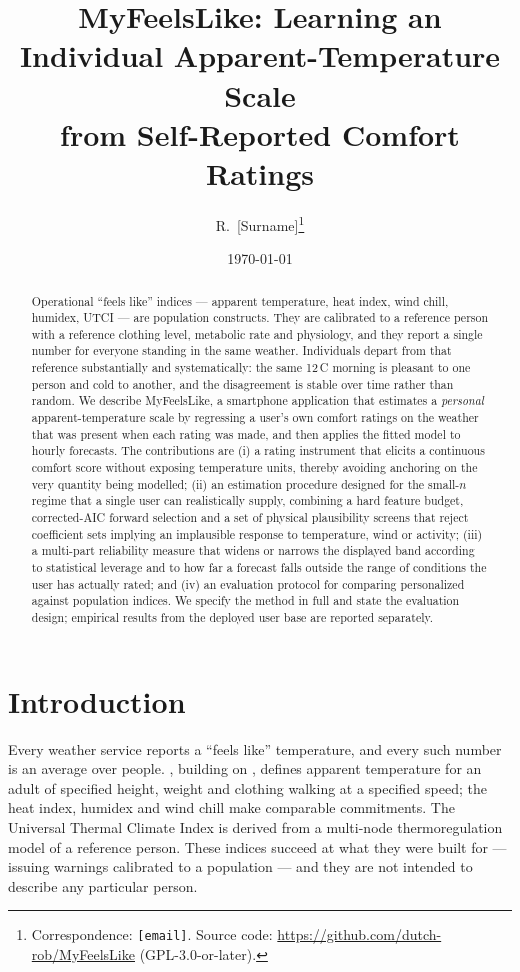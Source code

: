\documentclass[11pt]{article}
\title{MyFeelsLike: Learning an Individual Apparent-Temperature Scale\\
from Self-Reported Comfort Ratings}
\author{R.\ [Surname]\thanks{Correspondence: \texttt{[email]}. Source code:
\url{https://github.com/dutch-rob/MyFeelsLike} (GPL-3.0-or-later).}}
\date{\today}
\begin{document}
\maketitle

\begin{abstract}
Operational ``feels like'' indices --- apparent temperature, heat index, wind
chill, humidex, UTCI --- are population constructs. They are calibrated to a
reference person with a reference clothing level, metabolic rate and
physiology, and they report a single number for everyone standing in the same
weather. Individuals depart from that reference substantially and
systematically: the same 12\,\textdegree C morning is pleasant to one person
and cold to another, and the disagreement is stable over time rather than
random. We describe MyFeelsLike, a smartphone application that estimates a
\emph{personal} apparent-temperature scale by regressing a user's own comfort
ratings on the weather that was present when each rating was made, and then
applies the fitted model to hourly forecasts. The contributions are (i) a
rating instrument that elicits a continuous comfort score without exposing
temperature units, thereby avoiding anchoring on the very quantity being
modelled; (ii) an estimation procedure designed for the small-$n$ regime that
a single user can realistically supply, combining a hard feature budget,
corrected-AIC forward selection and a set of physical plausibility screens that
reject coefficient sets implying an implausible response to temperature, wind
or activity; (iii) a multi-part reliability measure that widens or narrows the
displayed band according to statistical leverage and to how far a forecast
falls outside the range of conditions the user has actually rated; and (iv) an
evaluation protocol for comparing personalized against population indices. We
specify the method in full and state the evaluation design; empirical results
from the deployed user base are reported separately.
\end{abstract}

\section{Introduction}

Every weather service reports a ``feels like'' temperature, and every such
number is an average over people. \citet{steadman1984}, building on
\citet{steadman1979}, defines apparent temperature for an adult of specified height, weight and clothing walking at a
specified speed; the heat index, humidex \citep{masterton1979} and wind chill
\citep{osczevski2005} make comparable commitments. The Universal Thermal
Climate Index \citep{jendritzky2012} is derived from a multi-node
thermoregulation model of a reference person. These indices succeed at what
they were built for --- issuing warnings calibrated to a population --- and
they are not intended to describe any particular person.
\end{document}
